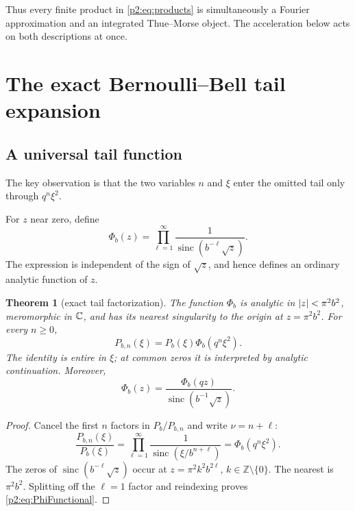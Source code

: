 \documentclass[11pt,oneside]{article}
\numberwithin{equation}{section}
\newtheorem{theorem}{Theorem}[section]
\theoremstyle{definition}
\theoremstyle{remark}
\newcommand{\sinc}{\operatorname{sinc}}
\begin{document}
Thus every finite product in \eqref{p2:eq:products} is simultaneously a Fourier
approximation and an integrated Thue--Morse object. The acceleration below acts
on both descriptions at once.

\section{The exact Bernoulli--Bell tail expansion}
\label{p2:sec:tail}

\subsection{A universal tail function}

The key observation is that the two variables \(n\) and \(\xi\) enter the omitted
tail only through \(q^n\xi^2\).

\begin{definition}
For \(z\) near zero, define
\begin{equation}
 \Phi_b(z)=\prod_{\ell=1}^{\infty}
 \frac1{\sinc(b^{-\ell}\sqrt z)}.
 \label{p2:eq:PhiDef}
\end{equation}
The expression is independent of the sign of \(\sqrt z\), and hence defines an
ordinary analytic function of \(z\).
\end{definition}

\begin{theorem}[exact tail factorization]
\label{p2:thm:tailfactor}
The function \(\Phi_b\) is analytic in \(\left\lvert z\right\rvert<\pi^2b^2\), meromorphic in
\(\mathbb{C}\), and has its nearest singularity to the origin at \(z=\pi^2b^2\). For
every \(n\geq0\),
\begin{equation}
 P_{b,n}(\xi)=P_b(\xi)\Phi_b(q^n\xi^2).
 \label{p2:eq:exacttail}
\end{equation}
The identity is entire in \(\xi\); at common zeros it is interpreted by analytic
continuation. Moreover,
\begin{equation}
 \Phi_b(z)=\frac{\Phi_b(qz)}{\sinc(b^{-1}\sqrt z)}.
 \label{p2:eq:PhiFunctional}
\end{equation}
\end{theorem}

\begin{proof}
Cancel the first \(n\) factors in \(P_b/P_{b,n}\) and write \(\nu=n+\ell\):
\[
 \frac{P_{b,n}(\xi)}{P_b(\xi)}
 =\prod_{\ell=1}^{\infty}
 \frac1{\sinc(\xi/b^{n+\ell})}
 =\Phi_b(q^n\xi^2).
\]
The zeros of \(\sinc(b^{-\ell}\sqrt z)\) occur at
\(z=\pi^2k^2b^{2\ell}\), \(k\in\mathbb Z\setminus\{0\}\). The nearest is
\(\pi^2b^2\). Splitting off the \(\ell=1\) factor and reindexing proves
\eqref{p2:eq:PhiFunctional}.
\end{proof}
\end{document}
